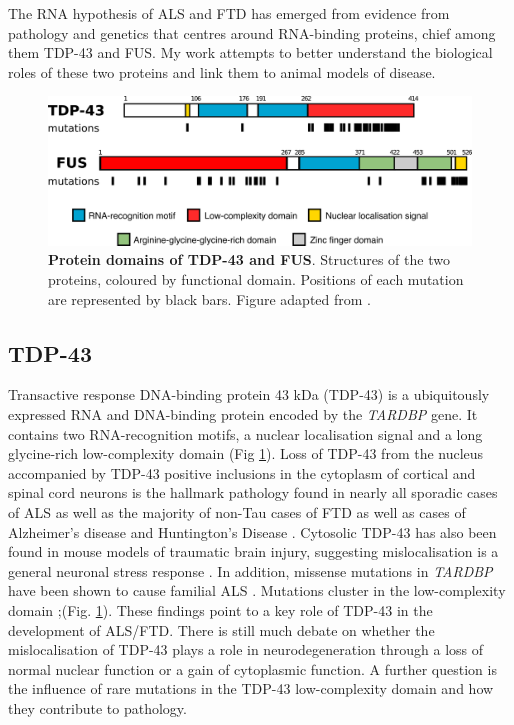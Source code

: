 The RNA hypothesis of ALS and FTD has emerged from evidence from pathology and genetics that centres around RNA-binding proteins, chief among them TDP-43 and FUS.
My work attempts to better understand the biological roles of these two proteins and link them to animal models of disease.

\begin{figure}[h!]
	\centering
	\includegraphics[width=\textwidth]{Figures/01_introduction/tdp_fus_structures.png}
	\caption[Protein domains of TDP-43 and FUS]{
		\textbf{Protein domains of TDP-43 and FUS}. Structures of the two proteins, coloured by functional domain. Positions of each mutation are represented by black bars. Figure adapted from \citep{Kapeli2017}. 
	}
	\label{fig:intro_domains}
\end{figure}


\subsection{TDP-43}

Transactive response DNA-binding protein 43 kDa (TDP-43) is a ubiquitously expressed RNA and DNA-binding protein encoded by the \emph{TARDBP} gene. 
It contains two RNA-recognition motifs, a nuclear localisation signal and a long glycine-rich low-complexity domain (Fig \ref{fig:intro_domains}).
Loss of TDP-43 from the nucleus accompanied by TDP-43 positive inclusions in the cytoplasm of cortical and spinal cord neurons is the hallmark pathology found in nearly all sporadic cases of ALS as well as the majority of non-Tau cases of FTD \citep{Neumann2006,Arai2006} as well as cases of Alzheimer's disease \citep{LaClair2016} and Huntington's Disease \citep{Doi2008}. 
Cytosolic TDP-43 has also been found in mouse models of traumatic brain injury, suggesting mislocalisation is a general neuronal stress response \citep{Moisse2009}. 
In addition, missense mutations in \emph{TARDBP} have been shown to cause familial ALS \citep{Sreedharan2008-xv}.  Mutations cluster in the low-complexity domain \citep{Kapeli2017};(Fig. \ref{fig:intro_domains}).
These findings point to a key role of TDP-43 in the development of ALS/FTD. 
There is still much debate on whether the mislocalisation of TDP-43 plays a role in neurodegeneration through a loss of normal nuclear function or a gain of cytoplasmic function.  
A further question is the influence of rare mutations in the TDP-43 low-complexity domain and how they contribute to pathology.

